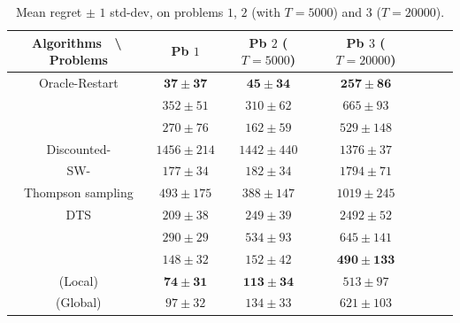 \begin{table}[ht]
    \centering
    \begin{tabular}{c|cccccc}
    \textbf{Algorithms} $\;$ \textbackslash $\;$ \textbf{Problems} & Pb $1$ & Pb $2$ ($T=5000$) & Pb $3$ ($T=20000$) \\
        \hline
        Oracle-Restart \klUCB{} & $\mathbf{37 \pm 37}$ & $\mathbf{45 \pm 34}$ & $\mathbf{257 \pm 86}$ \\
        \hline
        \ExpThreeS{} & $352 \pm 51$ & $310 \pm 62$ & $665 \pm 93$ \\
        \hline
        \klUCB{} & $270 \pm 76$ & $162 \pm 59$ & $529 \pm 148$ \\
        Discounted-\klUCB{} & $1456 \pm 214$ & $1442 \pm 440$ & $1376 \pm 37$ \\
        SW-\klUCB{} & $177 \pm 34$ & $182 \pm 34$ & $1794 \pm 71$ \\
        \hline
        Thompson sampling & $493 \pm 175$ & $388 \pm 147$ & $1019 \pm 245$ \\
        DTS & $209 \pm 38$ & $249 \pm 39$ & $2492 \pm 52$ \\
        \hline
        \MklUCB{} & $290 \pm 29$ & $534 \pm 93$ & $645 \pm 141$ \\
        \CUSUMklUCB{} & $148 \pm 32$ & $152 \pm 42$ & $\mathbf{490 \pm 133}$ \\
        \hline
        \GLRklUCB{}(Local) & $\mathbf{74 \pm 31}$ & $\mathbf{113 \pm 34}$ & $513 \pm 97$ \\
        \GLRklUCB{}(Global) & $97 \pm 32$ & $134 \pm 33$ & $621 \pm 103$
    \end{tabular}
    \caption{Mean regret $\pm$ $1$ std-dev, on problems $1$, $2$ (with $T=5000$) and $3$ ($T=20000$).}
    \label{table:6:totalResults1}
\end{table}

